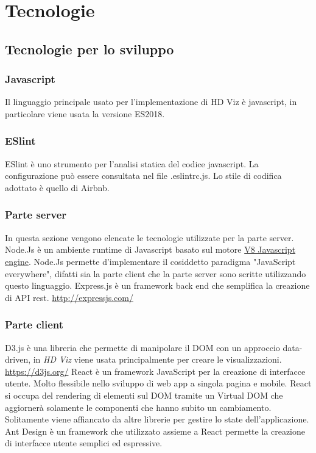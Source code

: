 \section{Tecnologie}
    \subsection{Tecnologie per lo sviluppo}
    \subsubsection{Javascript}
        Il linguaggio principale usato per l'implementazione di HD Viz è javascript, in particolare viene usata la versione ES2018.
    \subsubsection{ESlint}
        ESlint è uno strumento per l'analisi statica del codice javascript. La configurazione può essere consultata nel file .eslintrc.js. Lo stile di codifica adottato è quello di Airbnb.
    \subsubsection{Parte server}
    In questa sezione vengono elencate le tecnologie utilizzate per la parte server.
        Node.Js è un ambiente runtime di Javascript basato sul motore \href{https://v8.dev/}{V8 Javascript engine}. Node.Js permette d'implementare il cosiddetto paradigma "JavaScript everywhere", difatti sia la parte client che la parte server sono scritte utilizzando questo linguaggio.
        Express.js è un framework back end che semplifica la creazione di API rest.
        \href{http://expressjs.com/}{http://expressjs.com/}
    \subsubsection{Parte client}
        D3.js è una libreria che permette di manipolare il DOM con un approccio data-driven, in \textit{HD Viz} viene usata principalmente per creare le visualizzazioni.
        \href{https://d3js.org/}{https://d3js.org/}
        React è un framework JavaScript per la creazione di interfacce utente. Molto flessibile nello sviluppo di web app a singola pagina e mobile. React si occupa del rendering di elementi sul DOM tramite un Virtual DOM che aggiornerà  solamente le componenti che hanno subito un cambiamento. Solitamente viene affiancato da altre librerie per gestire lo state dell'applicazione.
        Ant Design è un framework che utilizzato assieme a React permette la creazione di interfacce utente semplici ed espressive.
